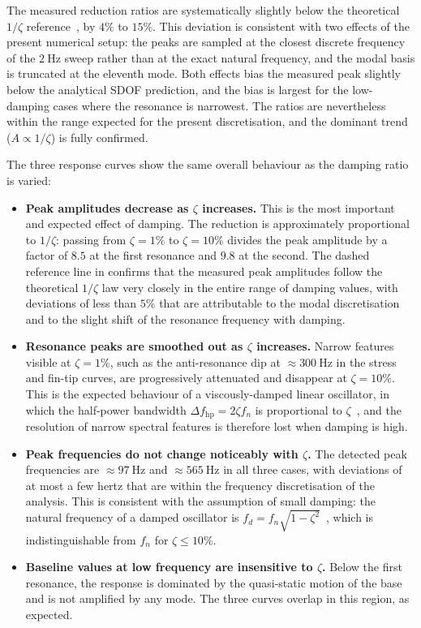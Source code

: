 The measured reduction ratios are systematically slightly below the theoretical $1/\zeta$ reference~\cite{inman_engineering_vibration}, by $4\%$ to $15\%$. This deviation is consistent with two effects of the present numerical setup: the peaks are sampled at the closest discrete frequency of the $\SI{2}{\hertz}$ sweep rather than at the exact natural frequency, and the modal basis is truncated at the eleventh mode. Both effects bias the measured peak slightly below the analytical SDOF prediction, and the bias is largest for the low-damping cases where the resonance is narrowest. The ratios are nevertheless within the range expected for the present discretisation, and the dominant trend ($A \propto 1/\zeta$) is fully confirmed.

The three response curves show the same overall behaviour as the damping ratio is varied:

\begin{itemize}
    \item \textbf{Peak amplitudes decrease as $\zeta$ increases.} This is the most important and expected effect of damping. The reduction is approximately proportional to $1/\zeta$: passing from $\zeta = 1\%$ to $\zeta = 10\%$ divides the peak amplitude by a factor of $8.5$ at the first resonance and $9.8$ at the second. The dashed reference line in  confirms that the measured peak amplitudes follow the theoretical $1/\zeta$ law very closely in the entire range of damping values, with deviations of less than $5\%$ that are attributable to the modal discretisation and to the slight shift of the resonance frequency with damping.

    \item \textbf{Resonance peaks are smoothed out as $\zeta$ increases.} Narrow features visible at $\zeta = 1\%$, such as the anti-resonance dip at $\approx \SI{300}{\hertz}$ in the stress and fin-tip curves, are progressively attenuated and disappear at $\zeta = 10\%$. This is the expected behaviour of a viscously-damped linear oscillator, in which the half-power bandwidth $\Delta f_\text{hp} = 2 \zeta f_n$ is proportional to $\zeta$~\cite{inman_engineering_vibration}, and the resolution of narrow spectral features is therefore lost when damping is high.

    \item \textbf{Peak frequencies do not change noticeably with $\zeta$.} The detected peak frequencies are $\approx \SI{97}{\hertz}$ and $\approx \SI{565}{\hertz}$ in all three cases, with deviations of at most a few hertz that are within the frequency discretisation of the analysis. This is consistent with the assumption of small damping: the natural frequency of a damped oscillator is $f_d = f_n \sqrt{1 - \zeta^2}$~\cite{inman_engineering_vibration}, which is indistinguishable from $f_n$ for $\zeta \le 10\%$.

    \item \textbf{Baseline values at low frequency are insensitive to $\zeta$.} Below the first resonance, the response is dominated by the quasi-static motion of the base and is not amplified by any mode. The three curves overlap in this region, as expected.
\end{itemize}


